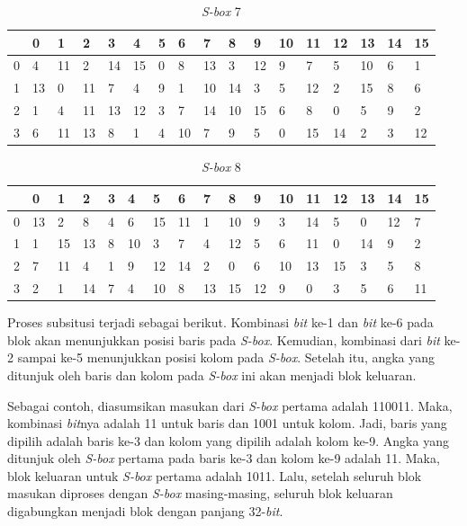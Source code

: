 \begin{table}[H]
	\caption{\textit{S-box} 7}\label{table:s_box7}
	\begin{center}
		\begin{tabular}{|l|l|l|l|l|l|l|l|l|l|l|l|l|l|l|l|l|}
				\hline
					& 0 & 1	& 2 & 3 & 4 & 5 & 6 & 7 & 8 & 9 & 10 & 11 & 12 & 13 & 14 & 15	\\ \hline
				0	&	4	&	11	&	2	&	14	&	15	&	0	&	8	&	13	&	3	&	12	&	9	&	7	&	5	&	10	&	6	&	1	\\ \hline
				1	&	13	&	0	&	11	&	7	&	4	&	9	&	1	&	10	&	14	&	3	&	5	&	12	&	2	&	15	&	8	&	6	\\ \hline
				2	&	1	&	4	&	11	&	13	&	12	&	3	&	7	&	14	&	10	&	15	&	6	&	8	&	0	&	5	&	9	&	2	\\ \hline
				3	&	6	&	11	&	13	&	8	&	1	&	4	&	10	&	7	&	9	&	5	&	0	&	15	&	14	&	2	&	3	&	12	\\ \hline
		\end{tabular}
	\end{center}
\end{table}

\begin{table}[H]
	\caption{\textit{S-box} 8}\label{table:s_box8}
	\begin{center}
		\begin{tabular}{|l|l|l|l|l|l|l|l|l|l|l|l|l|l|l|l|l|}
				\hline
				& 0 & 1	& 2 & 3 & 4 & 5 & 6 & 7 & 8 & 9 & 10 & 11 & 12 & 13 & 14 & 15	\\ \hline
			0	&	13	&	2	&	8	&	4	&	6	&	15	&	11	&	1	&	10	&	9	&	3	&	14	&	5	&	0	&	12	&	7	\\ \hline
			1	&	1	&	15	&	13	&	8	&	10	&	3	&	7	&	4	&	12	&	5	&	6	&	11	&	0	&	14	&	9	&	2	\\ \hline
			2	&	7	&	11	&	4	&	1	&	9	&	12	&	14	&	2	&	0	&	6	&	10	&	13	&	15	&	3	&	5	&	8	\\ \hline
			3	&	2	&	1	&	14	&	7	&	4	&	10	&	8	&	13	&	15	&	12	&	9	&	0	&	3	&	5	&	6	&	11	\\ \hline
		\end{tabular}
	\end{center}
\end{table}

Proses subsitusi terjadi sebagai berikut. Kombinasi \textit{bit} ke-1 dan \textit{bit} ke-6 pada blok akan menunjukkan posisi baris pada \textit{S-box}. Kemudian, kombinasi dari \textit{bit} ke-2 sampai ke-5 menunjukkan posisi kolom pada \textit{S-box}. Setelah itu, angka yang ditunjuk oleh baris dan kolom pada \textit{S-box} ini akan menjadi blok keluaran.

Sebagai contoh, diasumsikan masukan dari \textit{S-box} pertama adalah 110011. Maka, kombinasi \textit{bit}nya adalah 11 untuk baris dan 1001 untuk kolom. Jadi, baris yang dipilih adalah baris ke-3 dan kolom yang dipilih adalah kolom ke-9. Angka yang ditunjuk oleh \textit{S-box} pertama pada baris ke-3 dan kolom ke-9 adalah 11. Maka, blok keluaran untuk \textit{S-box} pertama adalah 1011. Lalu, setelah seluruh blok masukan diproses dengan \textit{S-box} masing-masing, seluruh blok keluaran digabungkan menjadi blok dengan panjang 32-\textit{bit}.

